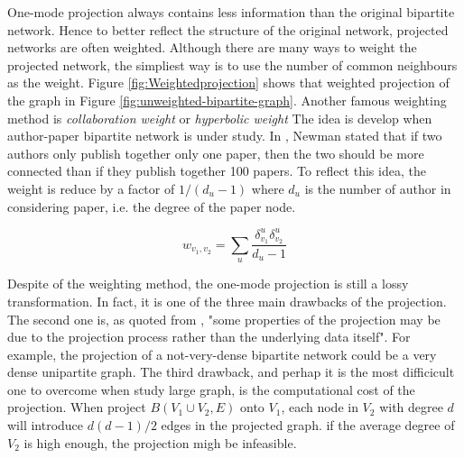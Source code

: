 One-mode projection always contains less information than the original bipartite network.
Hence to better reflect the structure of the original network,
projected networks are often weighted.
Although there are many ways to weight the projected network,
the simpliest way is to use the number of common neighbours as the weight.
Figure \ref{fig:Weightedprojection} shows that weighted projection of the graph in Figure \ref{fig:unweighted-bipartite-graph}.
Another famous weighting method is \textit{collaboration weight} or \textit{hyperbolic weight}
The idea is develop when author-paper bipartite network is under study.
In \parencite{newman2001}, Newman stated that if two authors only publish together only one paper,
then the two should be more connected than if they publish together 100 papers.
To reflect this idea, the weight is reduce by a factor of $1/(d_u-1)$
where $d_u$ is the number of author in considering paper, i.e. the degree of the paper node.

\begin{equation*}
	w_{v_1, v_2} = \sum_u \frac{\delta^u_{v_1}\delta^u_{v_2}}{d_u - 1}
\end{equation*}

Despite of the weighting method, the one-mode projection is still a lossy transformation.
In fact, it is one of the three main drawbacks of the projection.
The second one is, as quoted from \parencite{latapy2006},
"some properties of the projection may be due to the projection process rather than the underlying data itself".
For example, the projection of a not-very-dense bipartite network could be a very dense unipartite graph.
The third drawback, and perhap it is the most difficicult one to overcome when study large graph,
is the computational cost of the projection.
When project $B(V_1 \cup V_2, E)$ onto $V_1$,
each node in $V_2$ with degree $d$ will introduce $d(d-1)/2$ edges in the projected graph.
if the average degree of $V_2$ is high enough, the projection migh be infeasible.

